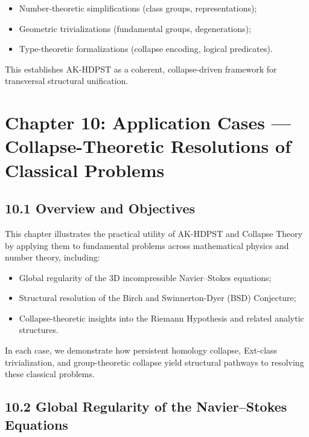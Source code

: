 \documentclass[11pt]{article}
\begin{document}
\begin{itemize}
    \item Number-theoretic simplifications (class groups, representations);
    \item Geometric trivializations (fundamental groups, degenerations);
    \item Type-theoretic formalizations (collapse encoding, logical predicates).
\end{itemize}

This establishes AK-HDPST as a coherent, collapse-driven framework for transversal structural unification.



\section{Chapter 10: Application Cases — Collapse-Theoretic Resolutions of Classical Problems}

\subsection*{10.1 Overview and Objectives}

This chapter illustrates the practical utility of AK-HDPST and Collapse Theory by applying them to fundamental problems across mathematical physics and number theory, including:

\begin{itemize}
    \item Global regularity of the 3D incompressible Navier–Stokes equations;
    \item Structural resolution of the Birch and Swinnerton-Dyer (BSD) Conjecture;
    \item Collapse-theoretic insights into the Riemann Hypothesis and related analytic structures.
\end{itemize}

In each case, we demonstrate how persistent homology collapse, Ext-class trivialization, and group-theoretic collapse yield structural pathways to resolving these classical problems.

\subsection*{10.2 Global Regularity of the Navier–Stokes Equations}
\end{document}

